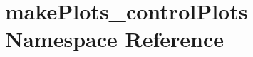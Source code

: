 \hypertarget{namespacemakePlots__controlPlots}{
\section{makePlots\_\-controlPlots Namespace Reference}
\label{namespacemakePlots__controlPlots}
}
